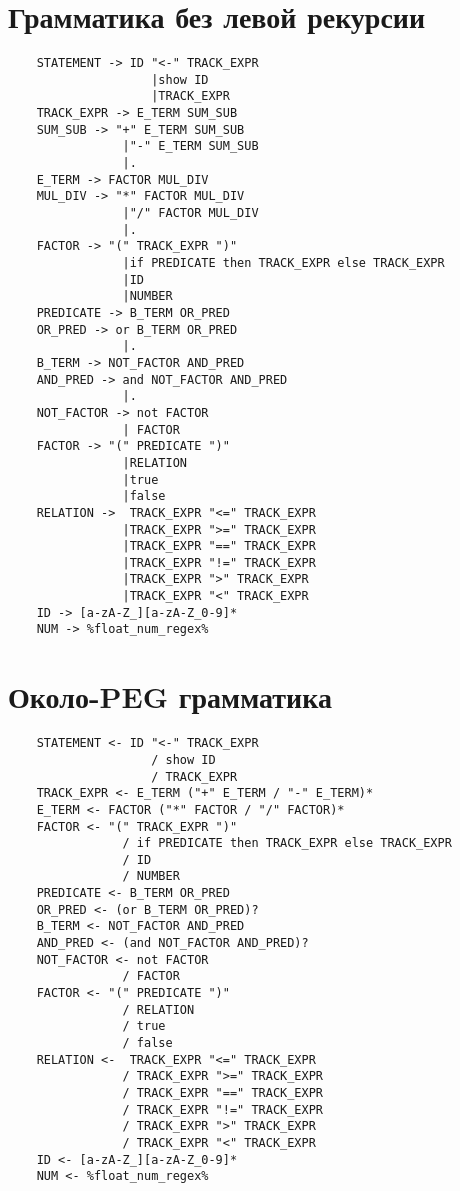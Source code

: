 \section*{Грамматика без левой рекурсии}
\begin{lstlisting}
	STATEMENT -> ID "<-" TRACK_EXPR 
	    			|show ID 
	   				|TRACK_EXPR
	TRACK_EXPR -> E_TERM SUM_SUB
	SUM_SUB -> "+" E_TERM SUM_SUB 
	      		|"-" E_TERM SUM_SUB 
	     		|.
	E_TERM -> FACTOR MUL_DIV
	MUL_DIV -> "*" FACTOR MUL_DIV 
	      		|"/" FACTOR MUL_DIV 
	      		|.
	FACTOR -> "(" TRACK_EXPR ")" 
	    		|if PREDICATE then TRACK_EXPR else TRACK_EXPR 
	    		|ID 
	    		|NUMBER
	PREDICATE -> B_TERM OR_PRED
	OR_PRED -> or B_TERM OR_PRED 
	         	|.
	B_TERM -> NOT_FACTOR AND_PRED
	AND_PRED -> and NOT_FACTOR AND_PRED 
	      		|.
	NOT_FACTOR -> not FACTOR 
	      		| FACTOR
	FACTOR -> "(" PREDICATE ")" 
	    		|RELATION
	    		|true 
	    		|false 
	RELATION ->  TRACK_EXPR "<=" TRACK_EXPR 
	    		|TRACK_EXPR ">=" TRACK_EXPR 
	    		|TRACK_EXPR "==" TRACK_EXPR 
	    		|TRACK_EXPR "!=" TRACK_EXPR
	    		|TRACK_EXPR ">" TRACK_EXPR 
	    		|TRACK_EXPR "<" TRACK_EXPR 
	ID -> [a-zA-Z_][a-zA-Z_0-9]*
	NUM -> %float_num_regex%
\end{lstlisting}

\newpage
\section*{Около-PEG грамматика}
\begin{lstlisting}
	STATEMENT <- ID "<-" TRACK_EXPR 
	    			/ show ID 
	   				/ TRACK_EXPR
	TRACK_EXPR <- E_TERM ("+" E_TERM / "-" E_TERM)*
	E_TERM <- FACTOR ("*" FACTOR / "/" FACTOR)*
	FACTOR <- "(" TRACK_EXPR ")" 
	    		/ if PREDICATE then TRACK_EXPR else TRACK_EXPR 
	    		/ ID 
	    		/ NUMBER
	PREDICATE <- B_TERM OR_PRED
	OR_PRED <- (or B_TERM OR_PRED)? 
	B_TERM <- NOT_FACTOR AND_PRED
	AND_PRED <- (and NOT_FACTOR AND_PRED)?
	NOT_FACTOR <- not FACTOR 
	      		/ FACTOR
	FACTOR <- "(" PREDICATE ")" 
	    		/ RELATION
	    		/ true 
	    		/ false 
	RELATION <-  TRACK_EXPR "<=" TRACK_EXPR 
	    		/ TRACK_EXPR ">=" TRACK_EXPR 
	    		/ TRACK_EXPR "==" TRACK_EXPR 
	    		/ TRACK_EXPR "!=" TRACK_EXPR
	    		/ TRACK_EXPR ">" TRACK_EXPR 
	    		/ TRACK_EXPR "<" TRACK_EXPR 
	ID <- [a-zA-Z_][a-zA-Z_0-9]*
	NUM <- %float_num_regex%
\end{lstlisting}


